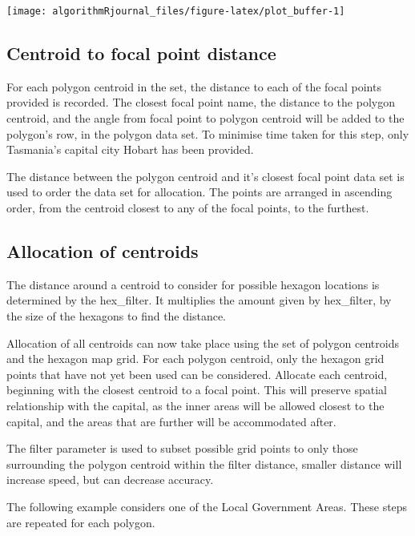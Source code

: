 \begin{Schunk}

\texttt{[image: algorithmRjournal\_files/figure-latex/plot\_buffer-1]} \end{Schunk}

\hypertarget{centroid-to-focal-point-distance}{%
\subsection{Centroid to focal point
distance}\label{centroid-to-focal-point-distance}}

For each polygon centroid in the set, the distance to each of the focal
points provided is recorded. The closest focal point name, the distance
to the polygon centroid, and the angle from focal point to polygon
centroid will be added to the polygon's row, in the polygon data set. To
minimise time taken for this step, only Tasmania's capital city Hobart
has been provided.

The distance between the polygon centroid and it's closest focal point
data set is used to order the data set for allocation. The points are
arranged in ascending order, from the centroid closest to any of the
focal points, to the furthest.

\hypertarget{allocation-of-centroids}{%
\subsection{Allocation of centroids}\label{allocation-of-centroids}}

The distance around a centroid to consider for possible hexagon
locations is determined by the hex\_filter. It multiplies the amount
given by hex\_filter, by the size of the hexagons to find the distance.

Allocation of all centroids can now take place using the set of polygon
centroids and the hexagon map grid. For each polygon centroid, only the
hexagon grid points that have not yet been used can be considered.
Allocate each centroid, beginning with the closest centroid to a focal
point. This will preserve spatial relationship with the capital, as the
inner areas will be allowed closest to the capital, and the areas that
are further will be accommodated after.

The filter parameter is used to subset possible grid points to only
those surrounding the polygon centroid within the filter distance,
smaller distance will increase speed, but can decrease accuracy.

The following example considers one of the Local Government Areas. These
steps are repeated for each polygon.

